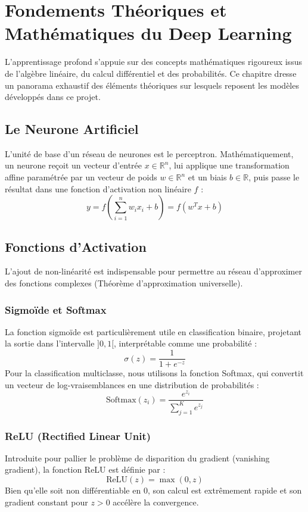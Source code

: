 \documentclass[a4paper,12pt]{report}
\begin{document}
\chapter{Fondements Théoriques et Mathématiques du Deep Learning}

L'apprentissage profond s'appuie sur des concepts mathématiques rigoureux issus de l'algèbre linéaire, du calcul différentiel et des probabilités. Ce chapitre dresse un panorama exhaustif des éléments théoriques sur lesquels reposent les modèles développés dans ce projet.

\section{Le Neurone Artificiel}
L'unité de base d'un réseau de neurones est le perceptron. Mathématiquement, un neurone reçoit un vecteur d'entrée $x \in \mathbb{R}^n$, lui applique une transformation affine paramétrée par un vecteur de poids $w \in \mathbb{R}^n$ et un biais $b \in \mathbb{R}$, puis passe le résultat dans une fonction d'activation non linéaire $f$ :
\begin{equation}
y = f\left(\sum_{i=1}^{n} w_i x_i + b\right) = f(w^T x + b)
\end{equation}

\section{Fonctions d'Activation}
L'ajout de non-linéarité est indispensable pour permettre au réseau d'approximer des fonctions complexes (Théorème d'approximation universelle).
\subsection{Sigmoïde et Softmax}
La fonction sigmoïde est particulièrement utile en classification binaire, projetant la sortie dans l'intervalle $]0, 1[$, interprétable comme une probabilité :
\begin{equation}
\sigma(z) = \frac{1}{1 + e^{-z}}
\end{equation}
Pour la classification multiclasse, nous utilisons la fonction Softmax, qui convertit un vecteur de log-vraisemblances en une distribution de probabilités :
\begin{equation}
\text{Softmax}(z_i) = \frac{e^{z_i}}{\sum_{j=1}^{K} e^{z_j}}
\end{equation}
\subsection{ReLU (Rectified Linear Unit)}
Introduite pour pallier le problème de disparition du gradient (vanishing gradient), la fonction ReLU est définie par :
\begin{equation}
\text{ReLU}(z) = \max(0, z)
\end{equation}
Bien qu'elle soit non différentiable en $0$, son calcul est extrêmement rapide et son gradient constant pour $z>0$ accélère la convergence.
\end{document}
